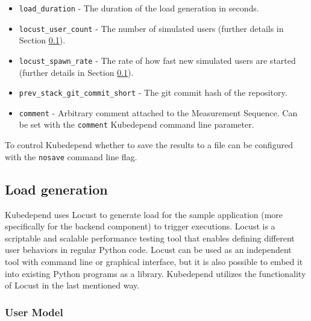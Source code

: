 \begin{itemize}
	\item \texttt{load\_duration} - The duration of the load generation in seconds.
	\item \texttt{locust\_user\_count} - The number of simulated users (further details in Section \ref{test-impl-load-generation}).
	\item \texttt{locust\_spawn\_rate} - The rate of how fast new simulated users are started (further details in Section \ref{test-impl-load-generation}).
	\item \texttt{prev\_stack\_git\_commit\_short} - The git commit hash of the repository.
	\item \texttt{comment} - Arbitrary comment attached to the Measurement Sequence. Can be set with the \texttt{comment} Kubedepend command line parameter.
	
\end{itemize}

To control Kubedepend whether to save the results to a file can be configured with the \texttt{nosave} command line flag.

\subsection{Load generation} \label{test-impl-load-generation}


Kubedepend uses Locust \cite{Locust} to generate load for the sample application (more specifically for the backend component) to trigger executions. Locust is a scriptable and scalable performance testing tool that enables defining different user behaviors in regular Python code. Locust can be used as an independent tool with command line or graphical interface, but it is also possible to embed it into existing Python programs as a library. Kubedepend utilizes the functionality of Locust in the last mentioned way.

\subsubsection{User Model}

